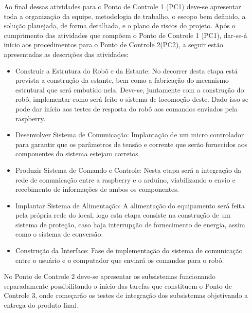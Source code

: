 Ao final dessas atividades para o Ponto de Controle 1 (PC1) deve-se apresentar toda a organização da equipe, metodologia de trabalho, o escopo bem definido, a solução planejada, de forma detalhada, e o plano de riscos do projeto. Após o cumprimento das atividades que compõem o Ponto de Controle 1 (PC1), dar-se-á início aos procedimentos para o Ponto de Controle 2(PC2), a seguir estão apresentadas as descrições das atividades:

\begin{itemize}
\item Construir a Estrutura do Robô e da Estante: No decorrer desta etapa está prevista a construção da estante, bem como a fabricação do mecanismo estrutural que será embutido nela. Deve-se, juntamente com a construção do robô, implementar como será feito o sistema de locomoção deste. Dado isso se pode dar início aos testes de resposta do robô aos comandos enviados pela raspberry.
\item Desenvolver Sistema de Comunicação: Implantação de um micro controlador para garantir que os parâmetros de tensão e corrente que serão fornecidos aos componentes do sistema estejam corretos.
\item Produzir Sistema de Comando e Controle: Nesta etapa será a integração da rede de comunicação entre a raspberry e o arduino, viabilizando o envio e recebimento de informações de ambos os componentes.
\item Implantar Sistema de Alimentação: A alimentação do equipamento será feita pela própria rede do local, logo esta etapa consiste na construção de um sistema de proteção, caso haja interrupção de fornecimento de energia, assim como o sistema de conversão.
\item Construção da Interface: Fase de implementação do sistema de comunicação entre o usuário e o computador que enviará os comandos para o robô.
\end{itemize}

No Ponto de Controle 2 deve-se apresentar os subsistemas funcionando separadamente possibilitando o início das tarefas que constituem o Ponto de Controle 3, onde começarão os testes de integração dos subsistemas objetivando a entrega do produto final. 

